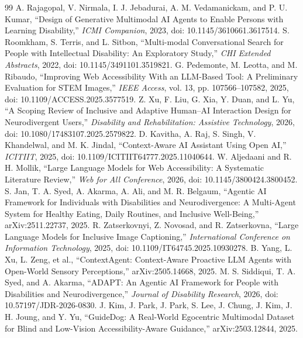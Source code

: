 \documentclass[12pt,a4paper,oneside]{report}
\begin{document}
\cleardoublepage{}
\begin{thebibliography}{99}\small
{} A. Rajagopal, V. Nirmala, I. J. Jebadurai, A. M. Vedamanickam, and P. U. Kumar, ``Design of Generative Multimodal AI Agents to Enable Persons with Learning Disability,'' \emph{ICMI Companion}, 2023, doi: 10.1145/3610661.3617514.
 S. Roomkham, S. Terris, and L. Sitbon, ``Multi-modal Conversational Search for People with Intellectual Disability: An Exploratory Study,'' \emph{CHI Extended Abstracts}, 2022, doi: 10.1145/3491101.3519821.
 G. Pedemonte, M. Leotta, and M. Ribaudo, ``Improving Web Accessibility With an LLM-Based Tool: A Preliminary Evaluation for STEM Images,'' \emph{IEEE Access}, vol. 13, pp. 107566--107582, 2025, doi: 10.1109/ACCESS.2025.3577519.
 Z. Xu, F. Liu, G. Xia, Y. Duan, and L. Yu, ``A Scoping Review of Inclusive and Adaptive Human--AI Interaction Design for Neurodivergent Users,'' \emph{Disability and Rehabilitation: Assistive Technology}, 2026, doi: 10.1080/17483107.2025.2579822.
 D. Kavitha, A. Raj, S. Singh, V. Khandelwal, and M. K. Jindal, ``Context-Aware AI Assistant Using Open AI,'' \emph{ICITIIT}, 2025, doi: 10.1109/ICITIIT64777.2025.11040644.
 W. Aljedaani and R. H. Mollik, ``Large Language Models for Web Accessibility: A Systematic Literature Review,'' \emph{Web for All Conference}, 2026, doi: 10.1145/3800424.3800452.
 S. Jan, T. A. Syed, A. Akarma, A. Ali, and M. R. Belgaum, ``Agentic AI Framework for Individuals with Disabilities and Neurodivergence: A Multi-Agent System for Healthy Eating, Daily Routines, and Inclusive Well-Being,'' arXiv:2511.22737, 2025.
 R. Zatserkovnyi, Z. Novosad, and R. Zatserkovna, ``Large Language Models for Inclusive Image Captioning,'' \emph{International Conference on Information Technology}, 2025, doi: 10.1109/IT64745.2025.10930278.
 B. Yang, L. Xu, L. Zeng, et al., ``ContextAgent: Context-Aware Proactive LLM Agents with Open-World Sensory Perceptions,'' arXiv:2505.14668, 2025.
 M. S. Siddiqui, T. A. Syed, and A. Akarma, ``ADAPT: An Agentic AI Framework for People with Disabilities and Neurodivergence,'' \emph{Journal of Disability Research}, 2026, doi: 10.57197/JDR-2026-0830.
 J. Kim, J. Park, J. Park, S. Lee, J. Chung, J. Kim, J. H. Joung, and Y. Yu, ``GuideDog: A Real-World Egocentric Multimodal Dataset for Blind and Low-Vision Accessibility-Aware Guidance,'' arXiv:2503.12844, 2025.

\end{thebibliography}
\end{document}
